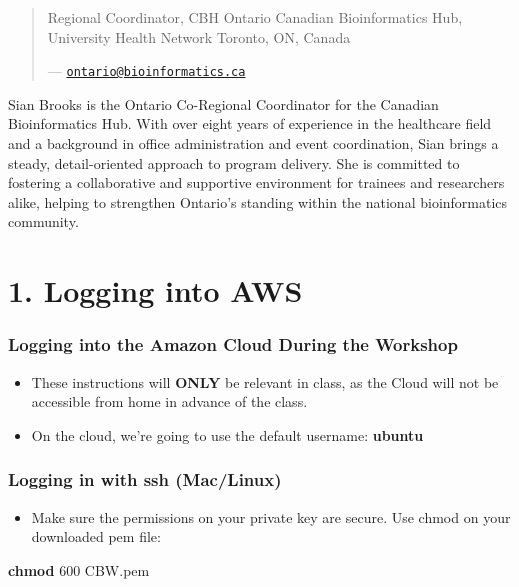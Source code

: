 \documentclass[
]{book}
\newenvironment{Shaded}{\begin{snugshade}}{\end{snugshade}}
\newcommand{\FunctionTok}[1]{\textcolor[rgb]{0.13,0.29,0.53}{\textbf{#1}}}
\newcommand{\NormalTok}[1]{#1}
\providecommand{\tightlist}{%
  \setlength{\itemsep}{0pt}\setlength{\parskip}{0pt}}
\begin{document}
\begin{quote}
Regional Coordinator, CBH Ontario
Canadian Bioinformatics Hub, University Health Network
Toronto, ON, Canada

--- \href{mailto:ontario@bioinformatics.ca}{\nolinkurl{ontario@bioinformatics.ca}}
\end{quote}

Sian Brooks is the Ontario Co-Regional Coordinator for the Canadian Bioinformatics Hub. With over eight years of experience in the healthcare field and a background in office administration and event coordination, Sian brings a steady, detail-oriented approach to program delivery. She is committed to fostering a collaborative and supportive environment for trainees and researchers alike, helping to strengthen Ontario's standing within the national bioinformatics community.

\chapter{1. Logging into AWS}\label{logging-into-aws}

\subsection{Logging into the Amazon Cloud During the Workshop}\label{logging-into-the-amazon-cloud-during-the-workshop}

\begin{itemize}
\item
  These instructions will \textbf{ONLY} be relevant in class, as the Cloud will not be accessible from home in advance of the class.
\item
  On the cloud, we're going to use the default username: \textbf{ubuntu}
\end{itemize}

\subsection{Logging in with ssh (Mac/Linux)}\label{logging-in-with-ssh-maclinux}

\begin{itemize}
\tightlist
\item
  Make sure the permissions on your private key are secure. Use chmod on your downloaded pem file:
\end{itemize}

\begin{Shaded}
\begin{Highlighting}[]
 \FunctionTok{chmod}\NormalTok{ 600 CBW.pem}
\end{Highlighting}
\end{Shaded}
\end{document}
